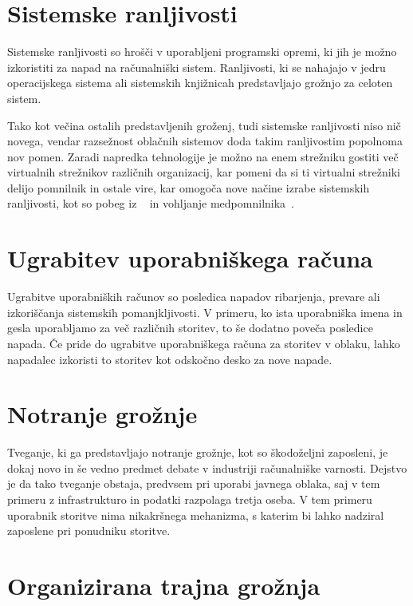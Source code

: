 \documentclass[12pt,a4paper,openany,tikz]{book}
\theoremstyle{plain}
\theoremstyle{definition}
\begin{document}
\section{Sistemske ranljivosti}
\label{sub:Sistemske ranljivosti}

Sistemske ranljivosti so hrošči v uporabljeni programski opremi, ki jih je možno izkoristiti za napad na računalniški sistem. Ranljivosti, ki se nahajajo v jedru operacijskega sistema ali sistemskih knjižnicah predstavljajo grožnjo za celoten sistem.

Tako kot večina ostalih predstavljenih groženj, tudi sistemske ranljivosti niso nič novega, vendar razsežnost oblačnih sistemov doda takim ranljivostim popolnoma nov pomen. Zaradi napredka tehnologije je možno na enem strežniku gostiti več virtualnih strežnikov različnih organizacij, kar pomeni da si ti virtualni strežniki delijo pomnilnik in ostale vire, kar omogoča nove načine izrabe sistemskih ranljivosti, kot so pobeg iz ~\cite{schwartz2012new} in vohljanje medpomnilnika~\cite{zhang2012cross}.

\section{Ugrabitev uporabniškega računa}
\label{sub:Ugrabitev uporabniškega računa}

Ugrabitve uporabniških računov so posledica napadov ribarjenja, prevare ali izkoriščanja sistemskih pomanjkljivosti. V primeru, ko ista uporabniška imena in gesla uporabljamo za več različnih storitev, to še dodatno poveča posledice napada. Če pride do ugrabitve uporabniškega računa za storitev v oblaku, lahko napadalec izkoristi to storitev kot odskočno desko za nove napade.

\section{Notranje grožnje}
\label{sub:Notranje grožnje}

Tveganje, ki ga predstavljajo notranje grožnje, kot so škodoželjni zaposleni, je dokaj novo in še vedno predmet debate v industriji računalniške varnosti. Dejstvo je da tako tveganje obstaja, predvsem pri uporabi javnega oblaka, saj v tem primeru z infrastrukturo in podatki razpolaga tretja oseba. V tem primeru uporabnik storitve nima nikakršnega mehanizma, s katerim bi lahko nadziral zaposlene pri ponudniku storitve.

\section{Organizirana trajna grožnja}
\label{sub:Organizirana trajna grožnja}
\end{document}
